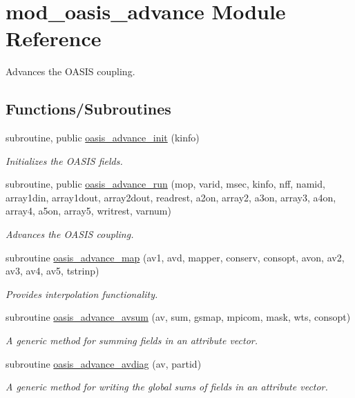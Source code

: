 \hypertarget{namespacemod__oasis__advance}{}\section{mod\+\_\+oasis\+\_\+advance Module Reference}
\label{namespacemod__oasis__advance}


Advances the O\+A\+S\+IS coupling.  


\subsection*{Functions/\+Subroutines}
\begin{DoxyCompactItemize}
\item 
subroutine, public \hyperlink{namespacemod__oasis__advance_a480bfe5b333300c1084af8f9c239a81d}{oasis\+\_\+advance\+\_\+init} (kinfo)
\begin{DoxyCompactList}\small\item\em Initializes the O\+A\+S\+IS fields. \end{DoxyCompactList}\item 
subroutine, public \hyperlink{namespacemod__oasis__advance_a932b0cbe5d1f5fa27c283c6472be7baf}{oasis\+\_\+advance\+\_\+run} (mop, varid, msec, kinfo, nff, namid, array1din, array1dout, array2dout, readrest, a2on, array2, a3on, array3, a4on, array4, a5on, array5, writrest, varnum)
\begin{DoxyCompactList}\small\item\em Advances the O\+A\+S\+IS coupling. \end{DoxyCompactList}\item 
subroutine \hyperlink{namespacemod__oasis__advance_a0514c843d051b8ee16adfb349eaee6a7}{oasis\+\_\+advance\+\_\+map} (av1, avd, mapper, conserv, consopt, avon, av2, av3, av4, av5, tstrinp)
\begin{DoxyCompactList}\small\item\em Provides interpolation functionality. \end{DoxyCompactList}\item 
subroutine \hyperlink{namespacemod__oasis__advance_acf8f4a02082ba2d9f32f0835ad14e11d}{oasis\+\_\+advance\+\_\+avsum} (av, sum, gsmap, mpicom, mask, wts, consopt)
\begin{DoxyCompactList}\small\item\em A generic method for summing fields in an attribute vector. \end{DoxyCompactList}\item 
subroutine \hyperlink{namespacemod__oasis__advance_a6faf6ac09dd35d44e62daad5e09d7b24}{oasis\+\_\+advance\+\_\+avdiag} (av, partid)
\begin{DoxyCompactList}\small\item\em A generic method for writing the global sums of fields in an attribute vector. \end{DoxyCompactList}\end{DoxyCompactItemize}
